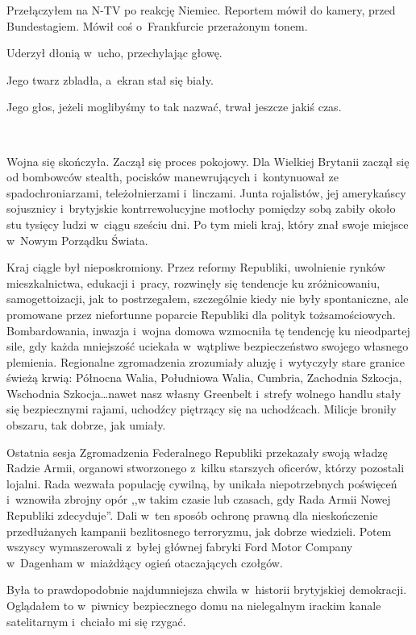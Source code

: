 \documentclass[oneside,polish,11pt,sfheadings]{mwbk}
\begin{document}
Przełączyłem na N-TV po reakcję Niemiec. Reportem mówił do kamery, przed
Bundestagiem. Mówił coś o~Frankfurcie przerażonym tonem.

Uderzył dłonią w~ucho, przechylając głowę.

Jego twarz zbladła, a~ekran stał się biały.

Jego głos, jeżeli moglibyśmy to tak nazwać, trwał jeszcze jakiś czas.

~

Wojna się skończyła. Zaczął się proces pokojowy. Dla Wielkiej Brytanii
zaczął się od bombowców stealth, pocisków manewrujących i~kontynuował ze
spadochroniarzami, teleżołnierzami i~linczami. Junta rojalistów, jej
amerykańscy sojusznicy i~brytyjskie kontrrewolucyjne motłochy pomiędzy
sobą zabiły około stu tysięcy ludzi w~ciągu sześciu dni. Po tym mieli
kraj, który znał swoje miejsce w~Nowym Porządku Świata. 

Kraj ciągle był nieposkromiony. Przez reformy Republiki, uwolnienie
rynków mieszkalnictwa, edukacji i~pracy, rozwinęły się tendencje ku
zróżnicowaniu, samogettoizacji, jak to postrzegałem, szczególnie kiedy
nie były spontaniczne, ale promowane przez niefortunne poparcie
Republiki dla polityk tożsamościowych. Bombardowania, inwazja i~wojna
domowa wzmocniła tę tendencję ku nieodpartej sile, gdy każda mniejszość
uciekała w~wątpliwe bezpieczeństwo swojego własnego plemienia.
Regionalne zgromadzenia zrozumiały aluzję i~wytyczyły stare granice
świeżą krwią: Północna Walia, Południowa Walia, Cumbria, Zachodnia
Szkocja, Wschodnia Szkocja\ldots nawet nasz własny Greenbelt i~strefy
wolnego handlu stały się bezpiecznymi rajami, uchodźcy piętrzący się na
uchodźcach. Milicje broniły obszaru, tak dobrze, jak umiały.

Ostatnia sesja Zgromadzenia Federalnego Republiki przekazały swoją
władzę Radzie Armii, organowi stworzonego z~kilku starszych oficerów,
którzy pozostali lojalni. Rada wezwała populację cywilną, by unikała
niepotrzebnych poświęceń i~wznowiła zbrojny opór ,,w takim czasie lub
czasach, gdy Rada Armii Nowej Republiki zdecyduje''. Dali w~ten sposób
ochronę prawną dla nieskończenie przedłużanych kampanii bezlitosnego
terroryzmu, jak dobrze wiedzieli. Potem wszyscy wymaszerowali z~byłej
głównej fabryki Ford Motor Company w~Dagenham w~miażdżący ogień
otaczających czołgów.

Była to prawdopodobnie najdumniejsza chwila w~historii brytyjskiej
demokracji. Oglądałem to w~piwnicy bezpiecznego domu na nielegalnym
irackim kanale satelitarnym i~chciało mi się rzygać.
\end{document}
